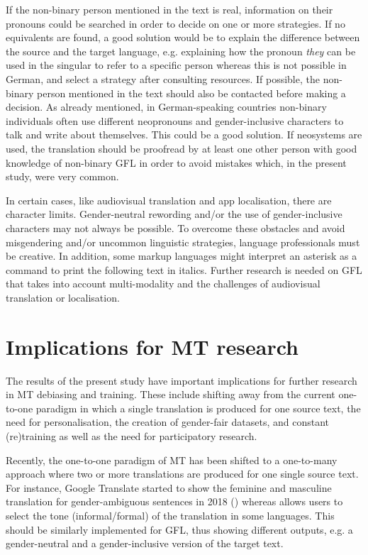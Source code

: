 If the non-binary person mentioned in the text is real, information on their pronouns could be searched in order to decide on one or more strategies. If no equivalents are found, a good solution would be to explain the difference between the source and the target language, e.g. explaining how the pronoun \textit{they} can be used in the singular to refer to a specific person whereas this is not possible in German, and select a strategy after consulting resources. If possible, the non-binary person mentioned in the text should also be contacted before making a decision. As already mentioned, in German-speaking countries non-binary individuals often use different neopronouns and gender-inclusive characters to talk and write about themselves. This could be a good solution. If neosystems are used, the translation should be proofread by at least one other person with good knowledge of non-binary GFL in order to avoid mistakes which, in the present study, were very common. 

In certain cases, like audiovisual translation and app localisation, there are character limits. Gender-neutral rewording and/or the use of gender-inclusive characters may not always be possible. To overcome these obstacles and avoid misgendering and/or uncommon linguistic strategies, language professionals must be creative. In addition, some markup languages might interpret an asterisk as a command to print the following text in italics. Further research is needed on GFL that takes into account multi-modality and the challenges of audiovisual translation or localisation.


\section{Implications for MT research}
The results of the present study have important implications for further research in MT debiasing and training. These include shifting away from the current one-to-one paradigm in which a single translation is produced for one source text, the need for personalisation, the creation of gender-fair datasets, and constant (re)training as well as the need for participatory research. 

Recently, the one-to-one paradigm of MT has been shifted to a one-to-many approach where two or more translations are produced for one single source text. For instance, Google Translate started to show the feminine and masculine translation for gender-ambiguous sentences in 2018 (\cite{googlebias}) whereas \textcite{deepl} allows users to select the tone (informal/formal) of the translation in some languages. This should be similarly implemented for GFL, thus showing different outputs, e.g. a gender-neutral and a gender-inclusive version of the target text.

